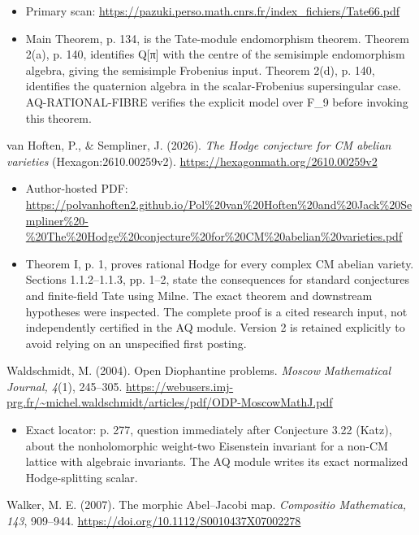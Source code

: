 \documentclass[11pt,a4paper]{article}
\providecommand{\tightlist}{\setlength{\itemsep}{0pt}\setlength{\parskip}{0pt}}
\theoremstyle{definition}\newtheorem{definition}[theorem]{Definition}
\theoremstyle{remark}\newtheorem{remark}[theorem]{Remark}
\begin{document}
\begin{itemize}
\tightlist
\item
  Primary scan:
  \url{https://pazuki.perso.math.cnrs.fr/index_fichiers/Tate66.pdf}
\item
  Main Theorem, p. 134, is the Tate-module endomorphism theorem. Theorem
  2(a), p. 140, identifies Q{[}π{]} with the centre of the semisimple
  endomorphism algebra, giving the semisimple Frobenius input. Theorem
  2(d), p. 140, identifies the quaternion algebra in the
  scalar-Frobenius supersingular case. AQ-RATIONAL-FIBRE verifies the
  explicit model over F\_9 before invoking this theorem.
\end{itemize}

van Hoften, P., \& Sempliner, J. (2026). \emph{The Hodge conjecture for
CM abelian varieties} (Hexagon:2610.00259v2).
\url{https://hexagonmath.org/2610.00259v2}

\begin{itemize}
\tightlist
\item
  Author-hosted PDF:
  \url{https://polvanhoften2.github.io/Pol\%20van\%20Hoften\%20and\%20Jack\%20Sempliner\%20-\%20The\%20Hodge\%20conjecture\%20for\%20CM\%20abelian\%20varieties.pdf}
\item
  Theorem I, p. 1, proves rational Hodge for every complex CM abelian
  variety. Sections 1.1.2--1.1.3, pp. 1--2, state the consequences for
  standard conjectures and finite-field Tate using Milne. The exact
  theorem and downstream hypotheses were inspected. The complete proof
  is a cited research input, not independently certified in the AQ
  module. Version 2 is retained explicitly to avoid relying on an
  unspecified first posting.
\end{itemize}

Waldschmidt, M. (2004). Open Diophantine problems. \emph{Moscow
Mathematical Journal, 4}(1), 245--305.
\url{https://webusers.imj-prg.fr/~michel.waldschmidt/articles/pdf/ODP-MoscowMathJ.pdf}

\begin{itemize}
\tightlist
\item
  Exact locator: p. 277, question immediately after Conjecture 3.22
  (Katz), about the nonholomorphic weight-two Eisenstein invariant for a
  non-CM lattice with algebraic invariants. The AQ module writes its
  exact normalized Hodge-splitting scalar.
\end{itemize}

Walker, M. E. (2007). The morphic Abel--Jacobi map. \emph{Compositio
Mathematica, 143}, 909--944.
\url{https://doi.org/10.1112/S0010437X07002278}
\end{document}
